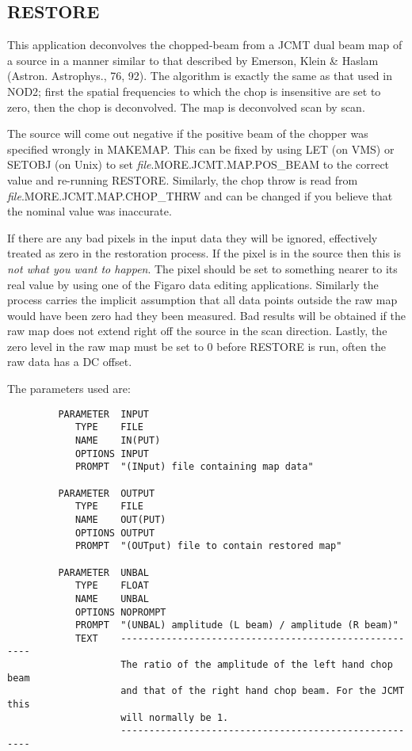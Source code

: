 \goodbreak

\subsection{RESTORE}

This application deconvolves the chopped-beam from a JCMT dual  beam
map of a source in a manner similar to that described by  Emerson,
Klein \& Haslam (Astron. Astrophys., 76, 92). The algorithm  is exactly
the same as that used in NOD2; first the spatial  frequencies to which
the chop is insensitive are set to zero,  then the chop is
deconvolved. The map is deconvolved scan by scan.

The source will come out negative if the positive beam of the chopper
was specified wrongly in MAKEMAP. This can be fixed by using LET (on
VMS) or SETOBJ (on Unix) to
set {\em file}.MORE.JCMT.MAP.POS\_BEAM to the correct value and
re-running RESTORE. Similarly, the chop throw  is read from {\em
file}.MORE.\-JCMT.\-MAP.CHOP\_THRW and can be changed if you  believe that
the nominal value was inaccurate.

If there are any bad pixels in the input data they will be ignored,
effectively treated as zero in the restoration process. If the pixel
is in the source then this is {\em not what you want to happen}. The
pixel should be set to something nearer to its real value by using one
of the Figaro data editing applications. Similarly  the process
carries the implicit assumption that all data points outside the raw
map would have been zero had they been measured. Bad results will be
obtained if the raw map does not extend right off the source in the
scan direction. Lastly, the zero level in the raw map must be set to 0
before RESTORE is run, often the raw data has a DC offset.

\goodbreak

The parameters used are:

\begin{small}
\begin{verbatim}
         PARAMETER  INPUT
            TYPE    FILE
            NAME    IN(PUT)
            OPTIONS INPUT
            PROMPT  "(INput) file containing map data"

         PARAMETER  OUTPUT
            TYPE    FILE
            NAME    OUT(PUT)
            OPTIONS OUTPUT
            PROMPT  "(OUTput) file to contain restored map"

         PARAMETER  UNBAL
            TYPE    FLOAT
            NAME    UNBAL
            OPTIONS NOPROMPT
            PROMPT  "(UNBAL) amplitude (L beam) / amplitude (R beam)"
            TEXT    ------------------------------------------------------
                    The ratio of the amplitude of the left hand chop beam
                    and that of the right hand chop beam. For the JCMT this
                    will normally be 1.
                    ------------------------------------------------------
\end{verbatim}
\end{small}


